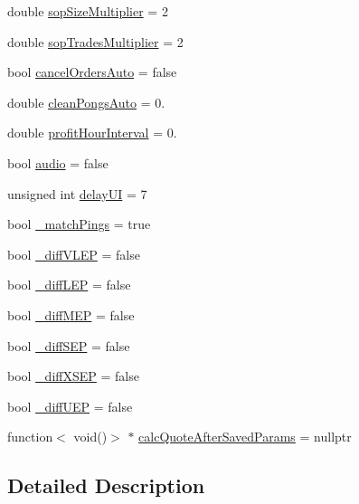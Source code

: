 \begin{DoxyCompactItemize}
\item 
double \hyperlink{struct_k_1_1m_quoting_params_a12996d4a63f260eadde561945f4de34a}{sop\+Size\+Multiplier} = 2
\item 
double \hyperlink{struct_k_1_1m_quoting_params_a2f287785df6177addf95607799ab4092}{sop\+Trades\+Multiplier} = 2
\item 
bool \hyperlink{struct_k_1_1m_quoting_params_a3a10c4191849a5c68d4c4837267d184c}{cancel\+Orders\+Auto} = false
\item 
double \hyperlink{struct_k_1_1m_quoting_params_a4b0a67a03f8ad8c612e57f550b026df3}{clean\+Pongs\+Auto} = 0.
\item 
double \hyperlink{struct_k_1_1m_quoting_params_aca375dffd0084ba4ca88fcdfeff7f99c}{profit\+Hour\+Interval} = 0.
\item 
bool \hyperlink{struct_k_1_1m_quoting_params_ac76cbef55dea9f125b6f88259693e97a}{audio} = false
\item 
unsigned int \hyperlink{struct_k_1_1m_quoting_params_a6c5f9f2975a817fbeb1c63a355108658}{delay\+UI} = 7
\item 
bool \hyperlink{struct_k_1_1m_quoting_params_a61446b4fb2c9d0703a4d2de65887792b}{\+\_\+match\+Pings} = true
\item 
bool \hyperlink{struct_k_1_1m_quoting_params_a0e836fed07704cb606e8ba0aaba6ea78}{\+\_\+diff\+V\+L\+EP} = false
\item 
bool \hyperlink{struct_k_1_1m_quoting_params_a1ce33c761bbda9cfde895b9be3c0bef1}{\+\_\+diff\+L\+EP} = false
\item 
bool \hyperlink{struct_k_1_1m_quoting_params_a2b3c89468dc78a966b83f64a7f653833}{\+\_\+diff\+M\+EP} = false
\item 
bool \hyperlink{struct_k_1_1m_quoting_params_a717403a01ee09fe008bd2e69565634c5}{\+\_\+diff\+S\+EP} = false
\item 
bool \hyperlink{struct_k_1_1m_quoting_params_ab502ee083f9bfede1b43659973f9ddcd}{\+\_\+diff\+X\+S\+EP} = false
\item 
bool \hyperlink{struct_k_1_1m_quoting_params_a3742efc61363ad9e1157430da409aa0e}{\+\_\+diff\+U\+EP} = false
\item 
function$<$ void()$>$ $\ast$ \hyperlink{struct_k_1_1m_quoting_params_aeada466ca69f4000ae2121f2c75fa7c6}{calc\+Quote\+After\+Saved\+Params} = nullptr
\end{DoxyCompactItemize}


\subsection{Detailed Description}


